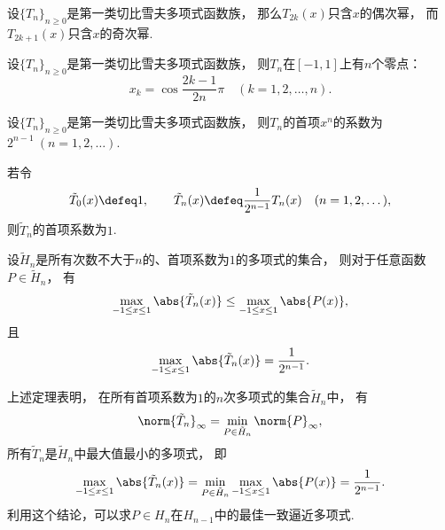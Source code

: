 \begin{property}
设\(\{T_n\}_{n\geq0}\)是第一类切比雪夫多项式函数族，
那么\(T_{2k}(x)\)只含\(x\)的偶次幂，
而\(T_{2k+1}(x)\)只含\(x\)的奇次幂.
\end{property}

\begin{property}
设\(\{T_n\}_{n\geq0}\)是第一类切比雪夫多项式函数族，
则\(T_n\)在\([-1,1]\)上有\(n\)个零点：\begin{equation}
	x_k = \cos\frac{2k-1}{2n}\pi
	\quad(k=1,2,\dotsc,n).
\end{equation}
\end{property}

\begin{property}
设\(\{T_n\}_{n\geq0}\)是第一类切比雪夫多项式函数族，
则\(T_n\)的首项\(x^n\)的系数为\(2^{n-1}\ (n=1,2,\dotsc)\).
\end{property}

若令\begin{equation*}
	\tilde{T}_0(x) \defeq 1,
	\qquad
	\tilde{T}_n(x) \defeq \frac1{2^{n-1}} T_n(x)
	\quad(n=1,2,\dotsc),
\end{equation*}
则\(\tilde{T}_n\)的首项系数为\(1\).

\begin{theorem}
设\(\tilde{H}_n\)是所有次数不大于\(n\)的、首项系数为\(1\)的多项式的集合，
则对于任意函数\(P \in \tilde{H}_n\)，
有\begin{equation*}
	\max_{-1 \leq x \leq 1} \abs{\tilde{T}_n(x)}
	\leq \max_{-1 \leq x \leq 1} \abs{P(x)},
\end{equation*}
且\begin{equation*}
	\max_{-1 \leq x \leq 1} \abs{\tilde{T}_n(x)}
	= \frac1{2^{n-1}}.
\end{equation*}
\end{theorem}
\begin{remark}
上述定理表明，
在所有首项系数为\(1\)的\(n\)次多项式的集合\(\tilde{H}_n\)中，
有\begin{equation*}
	\norm{\tilde{T}_n}_\infty
	= \min_{P \in \tilde{H}_n} \norm{P}_\infty,
\end{equation*}
所有\(\tilde{T}_n\)是\(\tilde{H}_n\)中最大值最小的多项式，
即\begin{equation*}
	\max_{-1 \leq x \leq 1} \abs{\tilde{T}_n(x)}
	= \min_{P \in \tilde{H}_n} \max_{-1 \leq x \leq 1} \abs{P(x)}
	= \frac1{2^{n-1}}.
\end{equation*}
利用这个结论，可以求\(P \in H_n\)在\(H_{n-1}\)中的最佳一致逼近多项式.
\end{remark}

